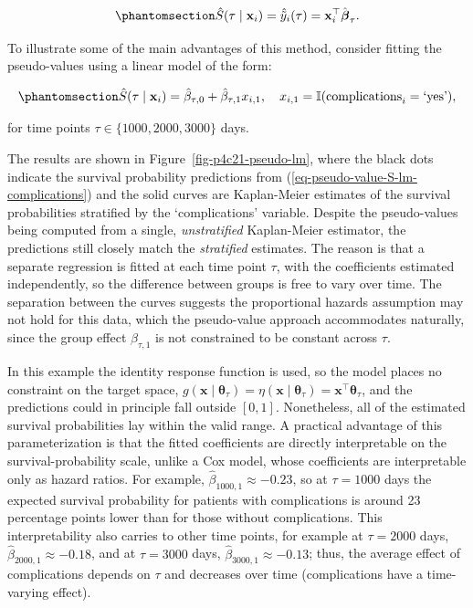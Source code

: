 \documentclass[
  letterpaper,
  krantz2]{style/krantz}
\begin{document}
\begin{equation}\phantomsection\label{eq-pseudo-value-S-lm}{
\hat{S}(\tau \mid \mathbf{x}_i) = \hat{\tilde{y}}_i(\tau) = \mathbf{x}_i^\top\hat{\boldsymbol{\beta}}_{\tau}.
}\end{equation}

To illustrate some of the main advantages of this method, consider
fitting the pseudo-values using a linear model of the form:

\begin{equation}\phantomsection\label{eq-pseudo-value-S-lm-complications}{
\hat{S}(\tau \mid \mathbf{x}_i) = \hat{\beta}_{\tau,0} + \hat{\beta}_{\tau,1} x_{i,1},\quad x_{i,1} = \mathbb{I}(\text{complications}_i = \text{`yes'}),
}\end{equation}

for time points \(\tau \in \{1000, 2000, 3000\}\) days.

The results are shown in Figure~\ref{fig-p4c21-pseudo-lm}, where the
black dots indicate the survival probability predictions from
(\ref{eq-pseudo-value-S-lm-complications}) and the solid curves are
Kaplan-Meier estimates of the survival probabilities stratified by the
`complications' variable. Despite the pseudo-values being computed from
a single, \emph{unstratified} Kaplan-Meier estimator, the predictions
still closely match the \emph{stratified} estimates. The reason is that
a separate regression is fitted at each time point \(\tau\), with the
coefficients estimated independently, so the difference between groups
is free to vary over time. The separation between the curves suggests
the proportional hazards assumption may not hold for this data, which
the pseudo-value approach accommodates naturally, since the group effect
\(\hat{\beta}_{\tau,1}\) is not constrained to be constant across
\(\tau\).

In this example the identity response function is used, so the model
places no constraint on the target space,
\(g(\mathbf{x}\mid\boldsymbol{\theta}_\tau) = \eta(\mathbf{x}\mid\boldsymbol{\theta}_\tau) = \mathbf{x}^\top\boldsymbol{\theta}_\tau\),
and the predictions could in principle fall outside \([0,1]\).
Nonetheless, all of the estimated survival probabilities lay within the
valid range. A practical advantage of this parameterization is that the
fitted coefficients are directly interpretable on the
survival-probability scale, unlike a Cox model, whose coefficients are
interpretable only as hazard ratios. For example,
\(\hat{\beta}_{1000,1} \approx -0.23\), so at \(\tau = 1000\) days the
expected survival probability for patients with complications is around
23 percentage points lower than for those without complications. This
interpretability also carries to other time points, for example at
\(\tau = 2000\) days, \(\hat{\beta}_{2000,1} \approx -0.18\), and at
\(\tau = 3000\) days, \(\hat{\beta}_{3000,1} \approx -0.13\); thus, the
average effect of complications depends on \(\tau\) and decreases over
time (complications have a time-varying
effect).
\end{document}
